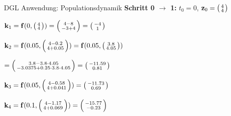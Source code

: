 \begin{example2}{DGL Anwendung: Populationsdynamik}
\textbf{Schritt 0 $\rightarrow$ 1:} $t_0 = 0$, $\mathbf{z}_0 = \begin{psmallmatrix} 4 \\ 4 \end{psmallmatrix}$

$\mathbf{k}_1 = \mathbf{f}(0, \begin{psmallmatrix} 4 \\ 4 \end{psmallmatrix}) = \begin{psmallmatrix} 4 - 8 \\ -3 + 4 \end{psmallmatrix} = \begin{psmallmatrix} -4 \\ 1 \end{psmallmatrix}$

$\mathbf{k}_2 = \mathbf{f}(0.05, \begin{psmallmatrix} 4 - 0.2 \\ 4 + 0.05 \end{psmallmatrix}) = \mathbf{f}(0.05, \begin{psmallmatrix} 3.8 \\ 4.05 \end{psmallmatrix})$

$= \begin{psmallmatrix} 3.8 - 3.8 \cdot 4.05 \\ -3.0375 + 0.25 \cdot 3.8 \cdot 4.05 \end{psmallmatrix} = \begin{psmallmatrix} -11.59 \\ 0.81 \end{psmallmatrix}$

$\mathbf{k}_3 = \mathbf{f}(0.05, \begin{psmallmatrix} 4 - 0.58 \\ 4 + 0.041 \end{psmallmatrix}) = \begin{psmallmatrix} -11.73 \\ 0.69 \end{psmallmatrix}$

$\mathbf{k}_4 = \mathbf{f}(0.1, \begin{psmallmatrix} 4 - 1.17 \\ 4 + 0.069 \end{psmallmatrix}) = \begin{psmallmatrix} -15.77 \\ -0.23 \end{psmallmatrix}$


\end{example2}
